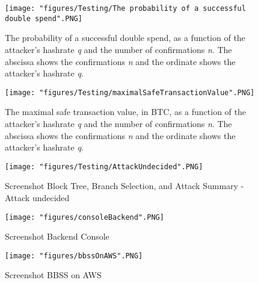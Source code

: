 \begin{appendices}
\begin{figure}[!htb]
\texttt{[image: "figures/Testing/The probability of a successful double spend".PNG]}
\caption{The probability of a successful double spend, as a function of the attacker's hashrate \textit{q} and the number of confirmations \textit{n}. The abscissa shows the confirmations \textit{n} and the ordinate shows the attacker's hashrate \textit{q}. \cite{doublespending}\label{fig:doubleSpend}}
\end{figure}

\begin{figure}[!htb]
\texttt{[image: "figures/Testing/maximalSafeTransactionValue".PNG]}
\caption{The maximal safe transaction value, in BTC, as a function of the attacker's hashrate \textit{q} and the number of confirmations \textit{n}. The abscissa shows the confirmations \textit{n} and the ordinate shows the attacker's hashrate \textit{q}. \cite{doublespending}\label{fig:maximalSafeTransactionValue}}
\end{figure}

\clearpage

\begin{figure}[!htb]
\centering
\texttt{[image: "figures/Testing/AttackUndecided".PNG]}
\caption{Screenshot Block Tree, Branch Selection, and Attack Summary - Attack undecided
\label{fig:AttackUndecided}}
\end{figure}

\begin{figure}[!htb]
\centering
\texttt{[image: "figures/consoleBackend".PNG]}
\caption{Screenshot Backend Console
\label{fig:simulation}}
\end{figure}

\begin{figure}[p]
\centering
\texttt{[image: "figures/bbssOnAWS".PNG]}
\caption{Screenshot BBSS on AWS
\label{fig:BBSSonAWS}}
\end{figure}

\end{appendices}